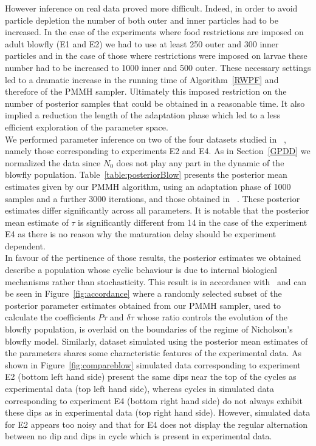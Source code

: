 \documentclass[12pt]{article}
\begin{document}
	However inference on real data proved more difficult. Indeed, in order to avoid particle depletion the number of both outer and inner particles had to be increased. In the case of the experiments where food restrictions are imposed on adult blowfly (E1 and E2) we had to use at least 250 outer and 300 inner particles and in the case of those where restrictions were imposed on larvae these number had to be increased to 1000 inner and 500 outer. These necessary settings led to a dramatic increase in the running time of Algorithm~\ref{RWPF} and therefore of the PMMH sampler. Ultimately this imposed restriction on the number of posterior samples that could be obtained in a reasonable time. It also implied a reduction the length of the adaptation phase which led to a less efficient exploration of the parameter space. \\
	We performed parameter inference on two of the four datasets studied in ~\cite{fasiolo2014statistical}, namely those corresponding to experiments E2 and E4. As in Section~\ref{GPDD} we normalized the data since $N_0$ does not play any part in the dynamic of the blowfly population.  Table~\ref{table:posteriorBlow} presents the posterior mean estimates given by our PMMH algorithm, using an adaptation phase of 1000 samples and a further 3000 iterations, and those obtained in ~\cite{fasiolo2014statistical}. These posterior estimates differ significantly across all parameters. It is notable that the posterior mean estimate of $\tau$ is significantly different from 14 in the case of the experiment E4 as there is no reason why the maturation delay should be experiment dependent. \\
	In favour of  the pertinence of those results, the posterior estimates we obtained describe a population whose cyclic behaviour is due to internal biological mechanisms rather than stochasticity. This result is in accordance with~\cite{gurney1980nicholson} and can be seen in Figure~\ref{fig:accordance} where a randomly selected subset of the posterior parameter estimates obtained from our PMMH sampler, used to calculate the coefficients $P\tau$ and $\delta\tau$ whose ratio controls the evolution of the blowfly population, is overlaid on the boundaries of the regime of Nicholson's blowfly model. Similarly, dataset simulated using the posterior mean estimates of the parameters shares some characteristic features of the experimental data. As shown in Figure~\ref{fig:compareblow} simulated data corresponding to experiment E2 (bottom left hand side) present the same dips near the top of the cycles as experimental data (top left hand side), whereas cycles in simulated data corresponding to experiment E4 (bottom right hand side) do not always exhibit these dips as in experimental data (top right hand side). However, simulated data for E2 appears too noisy and that for E4 does not display the regular alternation between no dip and dips in cycle which is present in experimental data.\\
\end{document}
